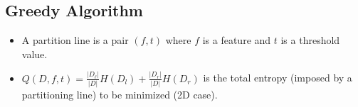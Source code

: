 \subsection{Greedy Algorithm}


\begin{itemize}
    \item A partition line is a pair $(f,t)$ where $f$ is a feature and $t$ is a threshold value.
    \item $Q(D,f,t)=\frac{|D_\ell|}{|D|}H(D_l)+\frac{|D_r|}{|D|}H(D_r)$ is the total entropy (imposed by a partitioning line) to be minimized (2D case).
\end{itemize}